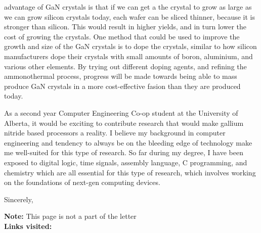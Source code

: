\documentclass[letterpaper]{letter}
\begin{document}
\begin{letter}
advantage of GaN crystals is that if we can get a the crystal to grow as large
as we can grow silicon crystals today, each wafer can be sliced thinner, because
it is stronger than silicon. This would result in higher yields, and in turn
lower the cost of growing the crystals. One method that could be used to improve
the growth and size of the GaN crystals is to dope the crystals, similar to how
silicon manufacturers dope their crystals with small amounts of boron,
aluminium, and various other elements. By trying out different doping agents,
and refining the ammonothermal process, progress will be made towards being able
to mass produce GaN crystals in a more cost-effective fasion than they are
produced today.



As a second year Computer Engineering Co-op student at the University of
Alberta, it would be exciting to contribute research that would make gallium
nitride based processors a reality. I believe my background in computer
engineering and tendency to always be on the bleeding edge of technology make me
well-suited for this type of research. So far during my degree, I have been
exposed to digital logic, time signals, assembly language, C programming, and
chemistry which are all essential for this type of research, which involves
working on the foundations of next-gen computing devices.

\closing{Sincerely,}

\end{letter}
\newpage
\textbf{Note:} This page is not a part of the letter\\
\textbf{Links visited:}
\end{document}
